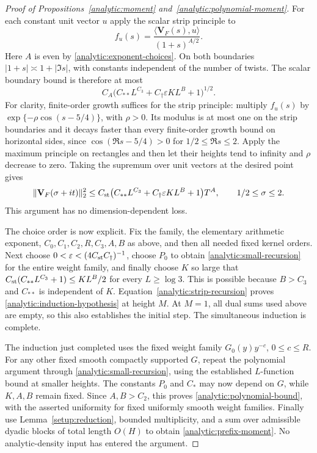 \begin{proof}[Proof of Propositions~\ref{analytic:moment} and~\ref{analytic:polynomial-moment}]
For each constant unit vector $u$ apply the scalar strip principle to
\[
 f_u(s)=\frac{\langle\mathbf V_F(s),u\rangle}{(1+s)^{A/2}}.
\]
Here $A$ is even by \eqref{analytic:exponent-choices}. On both
boundaries $|1+s|\asymp1+|\Im s|$, with constants independent of the
number of twists. The scalar boundary bound is therefore at most
\[
 C_A\big(C_{**}L^{C_3}+C_{\dagger}\varepsilon K L^B+1\big)^{1/2}.
\]
For clarity, finite-order growth suffices for the strip principle:
multiply $f_u(s)$ by
$\exp\{-\rho\cos(s-5/4)\}$, with $\rho>0$. Its modulus is at most
one on the strip boundaries and it decays faster than every
finite-order growth bound on horizontal sides, since
$\cos(\Re s-5/4)>0$ for $1/2\leq\Re s\leq2$. Apply the maximum
principle on rectangles and then let their heights tend to infinity
and $\rho$ decrease to zero. Taking the supremum over unit vectors
at the desired point gives
\begin{equation}\label{analytic:strip-recursion}
 \|\mathbf V_F(\sigma+it)\|_2^2
 \leq C_{\rm st}
       \big(C_{**}L^{C_3}+C_{\dagger}\varepsilon K L^B+1\big)T^A,
 \qquad 1/2\leq\sigma\leq2.
\end{equation}
This argument has no dimension-dependent loss.

The choice order is now explicit. Fix the family, the elementary
arithmetic exponent, $C_0,C_1,C_2,R,C_3,A,B$ as above, and then all
needed fixed kernel orders. Next choose
$0<\varepsilon<(4C_{\rm st}C_{\dagger})^{-1}$, choose $P_0$ to obtain
\eqref{analytic:small-recursion} for the entire weight family, and
finally choose $K$ so large that
$C_{\rm st}(C_{**}L^{C_3}+1)\leq K L^B/2$ for every $L\geq\log3$.
This is possible because $B>C_3$ and $C_{**}$ is independent of $K$.
Equation~\eqref{analytic:strip-recursion} proves
\eqref{analytic:induction-hypothesis} at height $M$. At $M=1$, all
dual sums used above are empty, so this also establishes the initial
step. The simultaneous induction is complete.

The induction just completed uses the fixed weight family
$G_0(y)y^{-c}$, $0\leq c\leq R$. For any other fixed smooth compactly
supported $G$, repeat the polynomial argument through
\eqref{analytic:small-recursion}, using the established $L$-function
bound at smaller heights. The constants $P_0$ and $C_*$ may now depend
on $G$, while $K,A,B$ remain fixed. Since $A,B>C_2$, this proves
\eqref{analytic:polynomial-bound}, with the asserted uniformity for
fixed uniformly smooth weight families.
Finally use Lemma~\ref{setup:reduction}, bounded multiplicity, and a
sum over admissible dyadic blocks of total length $O(H)$ to obtain
\eqref{analytic:prefix-moment}. No analytic-density input has entered
the argument.
\end{proof}

